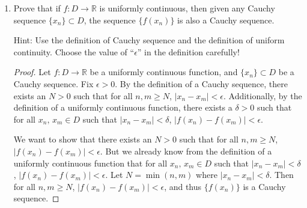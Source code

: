 \documentclass[12pt]{amsart}
\begin{document}
\begin{enumerate}
\begin{proof}
Fix $x\in\mathbb R\backslash \{0\}$. We need to show $\lim_{y\to x} \tfrac {f(x) - f(y)} {x-y} = \tfrac 1 {3 x^{2/3}}$. In other words:
%
\[ \lim_{y\to x} \frac {f(x) - f(y)} {x-y} = \lim_{y\to x} \frac {x^{1/3} - y^{1/3}} {x-y}. \]
%
Using the limit rules, we can write this as:
%
\[ \lim_{y\to x} \frac {x^{1/3} - y^{1/3}} {x-y} =  \lim_{y\to x} \frac 1 {x^{2/3} + x^{1/3}\cdot y^{1/3} + y^{2/3}}. \]
%
By the continuity of $\tfrac 1 {y^{1/3}}$ and $\tfrac 1 {y^{2/3}}$, we have:
%
\begin{align*}
 \lim_{y\to x} \frac 1 {x^{2/3} + x^{1/3}\cdot y^{1/3} + y^{2/3}} &=
\frac 1 {x^{2/3} + x^{1/3}\cdot x^{1/3} + x^{2/3}} \\
 &= \frac 1 {x^{2/3} + x^{2/3}+ x^{2/3}} \\
 &= \frac 1 {3 x^{2/3}}.
\end{align*}
%
\end{proof}

\item Prove that if $f : D \rightarrow \mathbb{R}$ is uniformly continuous, then given any Cauchy sequence $\{x_n\}\subset D$, the sequence $\{f(x_n)\}$ is also a Cauchy sequence.

Hint:  Use the definition of Cauchy sequence and the definition of uniform continuity.  Choose the value of ``$\epsilon$'' in the definition carefully!

\begin{proof}
Let $f : D \rightarrow \mathbb{R}$ be a uniformly continuous function, and $\{x_n\}\subset D$ be a Cauchy sequence. Fix $\epsilon > 0$. By the definition of a Cauchy sequence, there exists an $N > 0$ such that for all $n,m \ge N$, $|x_n - x_m| < \epsilon$. Additionally, by the definition of a uniformly continuous function, there exists a $\delta > 0$ such that for all $x_n,\,x_m\in D$ such that $|x_n-x_m|<\delta$, $|f(x_n)-f(x_m)|<\epsilon$.

We want to show that there exists an $N > 0$ such that for all $n,m \ge N$, $|f(x_n) - f(x_m)| < \epsilon$. But we already know from the definition of a uniformly continuous function that for all $x_n,\,x_m\in D$ such that $|x_n-x_m|<\delta$, $|f(x_n)-f(x_m)|<\epsilon$. Let $N=\min(n,m)$ where $|x_n-x_m|<\delta$. Then for all $n,m \ge N$, $|f(x_n) - f(x_m)| < \epsilon$, and thus $\{f(x_n)\}$ is a Cauchy sequence.
\end{proof}

%
%


\end{enumerate}
\end{document}
